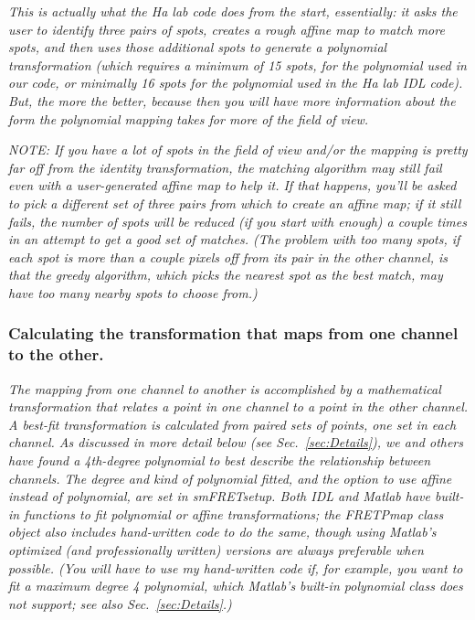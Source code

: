 \documentclass[11pt]{article}
\begin{document}
{\it This is actually what the Ha lab code does from the start, essentially: it asks the user to identify three pairs of spots, creates a rough affine map to match more spots, and then uses those additional spots to generate a polynomial transformation (which requires a minimum of 15 spots, for the polynomial used in our code, or minimally 16 spots for the polynomial used in the Ha lab IDL code).  But, the more the better, because then you will have more information about the form the polynomial mapping takes for more of the field of view.}

{\it NOTE: If you have a lot of spots in the field of view and/or the mapping is pretty far off from the identity transformation, the matching algorithm may still fail even with a user-generated affine map to help it.  If that happens, you'll be asked to pick a different set of three pairs from which to create an affine map; if it still fails, the number of spots will be reduced (if you start with enough) a couple times in an attempt to get a good set of matches. (The problem with too many spots, if each spot is more than a couple pixels off from its pair in the other channel, is that the greedy algorithm, which picks the nearest spot as the best match, may have too many nearby spots to choose from.)}\\


\subsubsection{Calculating the transformation that maps from one channel to the other.}

{\it The mapping from one channel to another is accomplished by a mathematical transformation that relates a point in one channel to a point in the other channel.  A best-fit transformation is calculated from paired sets of points, one set in each channel.  As discussed in more detail below (see Sec.~\ref{sec:Details}), we and others have found a 4th-degree polynomial to best describe the relationship between channels.  The degree and kind of polynomial fitted, and the option to use affine instead of polynomial, are set in smFRETsetup.  Both IDL and Matlab have built-in functions to fit polynomial or affine transformations; the FRETPmap class object also includes hand-written code to do the same, though using Matlab's optimized (and professionally written) versions are always preferable when possible. (You will have to use my hand-written code if, for example, you want to fit a maximum degree 4 polynomial, which Matlab's built-in polynomial class does not support; see also Sec.~\ref{sec:Details}.)}\\
\end{document}
